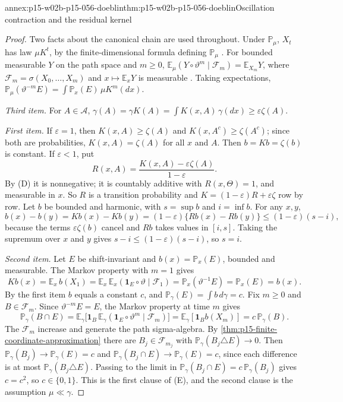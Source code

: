 \begin{annexitem}{annex:p15-w02b-p15-056-doeblin}{thm:p15-w02b-p15-056-doeblin}{Oscillation contraction and the residual kernel}
\begin{proof}
Two facts about the canonical chain are used throughout. Under
\(\mathbb P_\mu\), \(X_t\) has law \(\mu K^t\), by the finite-dimensional
formula defining \(\mathbb P_\mu\) \cite[Sec.~5.2, p.~273]{DurrettPTEAuthor2019}.
For bounded measurable \(Y\) on the path space and \(m\geq0\),
\(\mathbb E_\mu(Y\circ\vartheta^m\mid\mathcal F_m)=\mathbb E_{X_m}Y\),
where \(\mathcal F_m=\sigma(X_0,\ldots,X_m)\) and \(x\mapsto\mathbb E_xY\)
is measurable \cite[Theorem~5.2.3, p.~275]{DurrettPTEAuthor2019}.
Taking expectations, \(\mathbb P_\mu(\vartheta^{-m}E)=\int\mathbb P_x(E)\,\mu K^m(dx)\).

\emph{Third item.} For \(A\in\mathcal A\),
\(\gamma(A)=\gamma K(A)=\int K(x,A)\,\gamma(dx)\geq\varepsilon\zeta(A)\).

\emph{First item.} If \(\varepsilon=1\), then \(K(x,A)\geq\zeta(A)\) and
\(K(x,A^c)\geq\zeta(A^c)\); since both are probabilities, \(K(x,A)=\zeta(A)\)
for all \(x\) and \(A\). Then \(b=Kb=\zeta(b)\) is constant. If
\(\varepsilon<1\), put
\[
 R(x,A)=\frac{K(x,A)-\varepsilon\zeta(A)}{1-\varepsilon}.
\]
By (D) it is nonnegative; it is countably additive with \(R(x,\Theta)=1\),
and measurable in \(x\). So \(R\) is a transition probability and
\(K=(1-\varepsilon)R+\varepsilon\zeta\) row by row. Let \(b\) be bounded
and harmonic, with \(s=\sup b\) and \(i=\inf b\). For any \(x,y\),
\[
 b(x)-b(y)=Kb(x)-Kb(y)=(1-\varepsilon)\{Rb(x)-Rb(y)\}
 \leq(1-\varepsilon)(s-i),
\]
because the terms \(\varepsilon\zeta(b)\) cancel and \(Rb\) takes values in
\([i,s]\). Taking the supremum over \(x\) and \(y\) gives
\(s-i\leq(1-\varepsilon)(s-i)\), so \(s=i\).

\emph{Second item.} Let \(E\) be shift-invariant and \(b(x)=\mathbb P_x(E)\),
bounded and measurable. The Markov property with \(m=1\) gives
\[
 Kb(x)=\mathbb E_x\,b(X_1)=\mathbb E_x\,\mathbb E_x(\mathbf 1_E\circ\vartheta\mid\mathcal F_1)
 =\mathbb P_x(\vartheta^{-1}E)=\mathbb P_x(E)=b(x).
\]
By the first item \(b\) equals a constant \(c\), and
\(\mathbb P_\gamma(E)=\int b\,d\gamma=c\). Fix \(m\geq0\) and
\(B\in\mathcal F_m\). Since \(\vartheta^{-m}E=E\), the Markov property at
time \(m\) gives
\[
 \mathbb P_\gamma(B\cap E)=\mathbb E_\gamma\bigl[\mathbf 1_B\,
 \mathbb E_\gamma(\mathbf 1_E\circ\vartheta^m\mid\mathcal F_m)\bigr]
 =\mathbb E_\gamma[\mathbf 1_Bb(X_m)]=c\,\mathbb P_\gamma(B).
\]
The \(\mathcal F_m\) increase and generate the path sigma-algebra. By
\cref{thm:p15-finite-coordinate-approximation} there are
\(B_j\in\mathcal F_{m_j}\) with \(\mathbb P_\gamma(B_j\triangle E)\to0\).
Then \(\mathbb P_\gamma(B_j)\to\mathbb P_\gamma(E)=c\) and
\(\mathbb P_\gamma(B_j\cap E)\to\mathbb P_\gamma(E)=c\), since each
difference is at most \(\mathbb P_\gamma(B_j\triangle E)\). Passing to the
limit in \(\mathbb P_\gamma(B_j\cap E)=c\,\mathbb P_\gamma(B_j)\) gives
\(c=c^2\), so \(c\in\{0,1\}\). This is the first clause of (E), and the
second clause is the assumption \(\mu\ll\gamma\).


\end{proof}
\end{annexitem}
